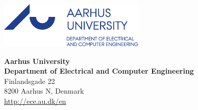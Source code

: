 \cleardoublepage


\BgThispage  %

\begin{minipage}[t]{0.48\textwidth}
	\vspace*{0pt}			%
	\includegraphics[width=0.74\linewidth]{figs/logos/AUpantoneBlueMPE.pdf}
\end{minipage}
\hfill
\begin{minipage}[t]{0.3\textwidth}
    \begin{flushright}
        {\small 
        \textbf{Aarhus University \\
        Department of Electrical
        and Computer Engineering} \\
        Finlandsgade 22 \\
        8200 Aarhus N, Denmark \\
        \url{http://ece.au.dk/en}}
    \end{flushright}
\end{minipage}

\vspace{5ex}

\noindent\makebox[\linewidth]{{\rule{0.8\paperwidth}{4pt}}}

\vspace{5ex}


